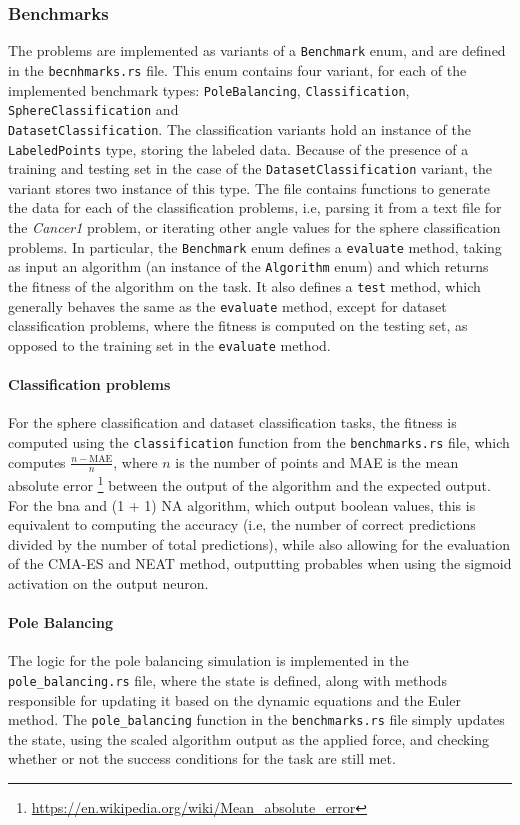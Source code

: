 \subsubsection{Benchmarks}

The problems are implemented as variants of a \texttt{Benchmark} enum, and are defined in the \texttt{becnhmarks.rs} file.
This enum contains four variant, for each of the implemented benchmark types: \texttt{PoleBalancing}, \texttt{Classification}, \texttt{SphereClassification}
and \\ \texttt{DatasetClassification}.
The classification variants hold an instance of the \texttt{LabeledPoints} type, storing the labeled data.
Because of the presence of a training and testing set in the case of the \texttt{DatasetClassification} variant, the variant stores two instance of this type.
The file contains functions to generate the
data for each of the classification problems, i.e, parsing it from a text file for the \textit{Cancer1} problem, or iterating other
angle values for the sphere classification problems. In particular, the \texttt{Benchmark} enum defines a \texttt{evaluate} method, taking as input an
algorithm (an instance of the \texttt{Algorithm} enum) and which returns the fitness of the algorithm on the task.
It also defines a \texttt{test} method, which generally behaves the same as the \texttt{evaluate} method, except for dataset classification problems, where
the fitness is computed on the testing set, as opposed to the training set in the \texttt{evaluate} method.

\paragraph{Classification problems} For the sphere classification and dataset classification tasks, the fitness is computed using the \texttt{classification}
function from the \texttt{benchmarks.rs} file, which computes $\frac{n - \text{MAE}}{n}$, where $n$ is the number of points and MAE is the mean absolute error
\footnote{\url{https://en.wikipedia.org/wiki/Mean_absolute_error}} between the output of the algorithm and the expected output. For the bna and (1 + 1) NA algorithm, which
output boolean values, this is equivalent to computing the accuracy (i.e, the number of correct predictions divided by the number of total predictions), while also
allowing for the evaluation of the CMA-ES and NEAT method, outputting probables when using the sigmoid activation on the output neuron.

\paragraph{Pole Balancing} The logic for the pole balancing simulation is implemented in the  \\ \texttt{pole\_balancing.rs} file, where the state is defined, along with methods
responsible for updating it based on the dynamic equations and the Euler method. The \texttt{pole\_balancing} function in the \texttt{benchmarks.rs} file simply
updates the state, using the scaled algorithm output as the applied force, and checking whether or not the success conditions for the task are still met.


